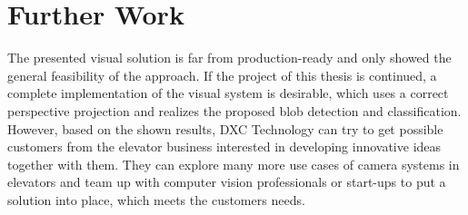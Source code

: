 \section{Further Work}

The presented visual solution is far from production-ready and only showed the general feasibility of the approach.
If the project of this thesis is continued, a complete implementation of the visual system is desirable, which uses a correct perspective projection and realizes the proposed blob detection and classification.
However, based on the shown results, DXC Technology can try to get possible customers from the elevator business interested in developing innovative ideas together with them.
They can explore many more use cases of camera systems in elevators and team up with computer vision professionals or start-ups to put a solution into place, which meets the customers needs.
